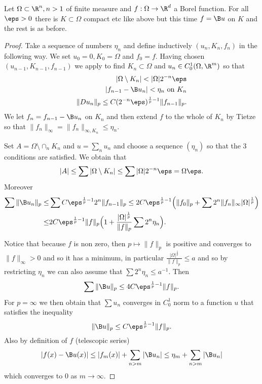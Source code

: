 \begin{lemma}
Let $\Omega\subset \R^n,n>1$ of finite measure and $f:\Omega\to \R^d$ a Borel function. For all $\eps>0$ there is $K\subset \Omega$ compact etc like above but this time $f=\B u$ on $K$ and the rest is as before.
\end{lemma}

\begin{proof}
Take a sequence of numbers $\eta_n$ and define inductively $(u_n,K_n,f_n)$ in the following way. We set $u_0=0,K_0=\Omega$ and $f_0=f$. Having chosen $(u_{n-1},K_{n-1}, f_{n-1})$ we apply  to find $K_n\subset \Omega$ and $u_n\in C_0^1(\Omega,\R^m)$ so that
\begin{align}
|\Omega\setminus K_n|<|\Omega|2^{-n} \eps \\
|f_{n-1}-\B u_n|<\eta_n \text{ on } K_n \\
\| Du_n\|_p \leq C (2^{-n} \eps)^{\frac{1}{p}-1} \|f_{n-1} \|_p.
\end{align}
We let $f_n = f_{n-1}-\B u_n$ on $K_n$ and then extend $f$ to the whole of $K_n$ by Tietze so that $\|f_n\|_\infty = \|f_n\|_{\infty,K_n} \leq \eta_n$.


Set $A = \Omega\setminus \cap_n K_n$ and $u=\sum_n u_n$ and choose a sequence $(\eta_n)$ so that the 3 conditions are satisfied. We obtain that
\begin{equation}
|A| \leq \sum |\Omega\setminus K_n| \leq \sum |\Omega|2^{-n} \eps = \Omega \eps.
\end{equation}
Moreover
\begin{align*}
\sum \|\B u_n\|_p \leq & \sum C \eps^{\frac{1}{p}-1} 2^n \|f_{n-1}\|_p \leq 2 C \eps^{\frac{1}{p}-1} \Big( \|f_0\|_p + \sum 2^n \|f_n\|_\infty |\Omega|^\frac{1}{p} \Big) \\
\leq & 2 C \eps^{\frac{1}{p}-1} \|f\|_p \Big( 1 + \frac{|\Omega|^\frac{1}{p}}{\|f\|_p} \sum 2^n \eta_n \Big).
\end{align*}

Notice that because $f$ is non zero, then $p\mapsto \|f\|_p$ is positive and converges to $\|f\|_\infty>0$ and so it has a minimum, in particular $\frac{|\Omega|^\frac{1}{p}}{\|f\|_p} \leq a$ and so by restricting $\eta_n$ we can also assume that $\sum 2^n \eta_n \leq a^{-1}$. Then
\begin{equation}
\sum \|\B u\|_p \leq 4C\eps^{\frac{1}{p}-1} \|f\|_p.
\end{equation}
For $p=\infty$ we then obtain that $\sum u_n$ converges in $C_0^1$ norm to a function $u$ that satisfies the inequality
\begin{equation}
\|\B u\|_p \leq C \eps^{\frac{1}{p}-1} \|f\|_p.
\end{equation}
Also by definition of $f$ (telescopic series)
\begin{equation}
|f(x)-\B u(x)| \leq |f_m(x)| + \sum_{n>m} |\B u_n| \leq \eta_m + \sum_{n>m} |\B u_n|
\end{equation}
which converges to $0$ as $m\to \infty$.


\end{proof}
